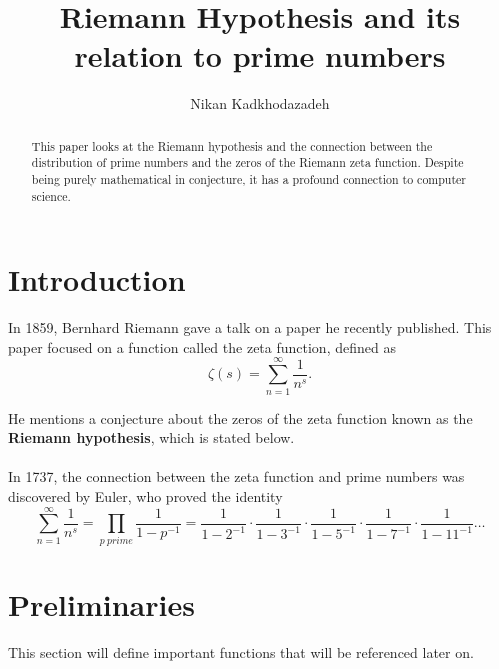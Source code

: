 \documentclass[12pt]{amsart} %
\theoremstyle{definition}
\theoremstyle{remark}
\numberwithin{equation}{section}
\begin{document}
\title{Riemann Hypothesis and its relation to prime numbers}

\author{Nikan Kadkhodazadeh}
\address{Department of Computer Science, University of Southern Maine, 
Portland, ME}

\begin{abstract}
This paper looks at the Riemann hypothesis and the connection between the distribution of prime numbers and the zeros of the Riemann zeta function. Despite being purely mathematical in conjecture, it has a profound connection to computer science.\end{abstract}

\maketitle
\tableofcontents

\section{Introduction}
In 1859, Bernhard Riemann gave a talk on a paper he recently published. This paper focused on a function called the zeta function, defined as
$$\zeta(s) = \sum_{n=1}^\infty \frac{1}{n^s}.$$

He mentions a conjecture about the zeros of the zeta function known as the \textbf{Riemann hypothesis}, which is stated below.
\\

\noindent{}
\\

In 1737, the connection between the zeta function and prime numbers was discovered by Euler, who proved the identity 
$$\sum_{n=1}^\infty \frac{1}{n^s} = 
  \prod_{p \ prime} \frac{1}{1-p^{-1}} = \frac{1}{1-2^{-1}}
 \cdot \frac{1}{1-3^{-1}} \cdot \frac{1}{1-5^{-1}} \cdot \frac{1}{1-7^{-1}} \cdot \frac{1}{1-11^{-1}} \ldots$$
 \newpage
\section{Preliminaries}
This section will define important functions that will be referenced later on.
\end{document}
